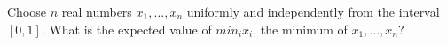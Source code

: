 Choose $n$ real numbers $x_1 , \dots, x_n$ uniformly and independently from the interval $[0, 1]$.
What is the expected value of $min_i x_i$, the minimum of $x_1 , \dots, x_n$?

